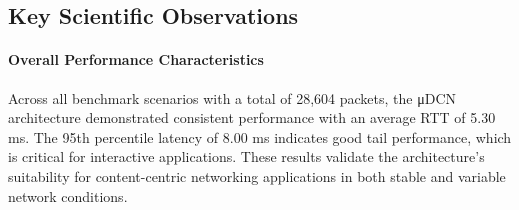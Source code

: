 \subsection{Key Scientific Observations}

\paragraph{Overall Performance Characteristics} 
Across all benchmark scenarios with a total of 28,604 packets, the μDCN architecture demonstrated consistent performance with an average RTT of 5.30 ms. The 95th percentile latency of 8.00 ms indicates good tail performance, which is critical for interactive applications. These results validate the architecture's suitability for content-centric networking applications in both stable and variable network conditions.